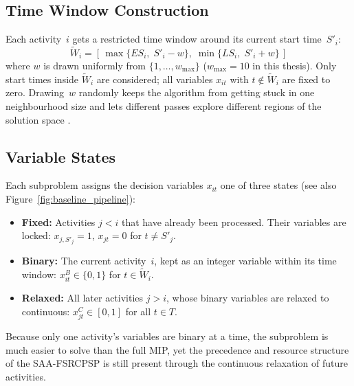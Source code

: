 \subsection{Time Window Construction}
\label{subsec:time_window}
Each activity~$i$ gets a restricted time window around its current
start time~$S'_i$:
\begin{equation}
    \widetilde{W}_i =
    \left[\,\max\{ES_i,\; S'_i - w\},\;
           \min\{LS_i,\; S'_i + w\}\,\right]
    \label{eq:time_window}
\end{equation}
where $w$ is drawn uniformly from $\{1, \ldots, w_{\max}\}$
($w_{\max} = 10$ in this thesis). Only start times inside
$\widetilde{W}_i$ are considered; all variables $x_{it}$ with
$t \notin \widetilde{W}_i$ are fixed to zero. Drawing~$w$ randomly
keeps the algorithm from getting stuck in one neighbourhood size
and lets different passes explore different regions of the solution
space \parencite{pochet2006}.
\subsection{Variable States}
\label{subsec:variable_states}
Each subproblem assigns the decision variables $x_{it}$ one of
three states (see also Figure~\ref{fig:baseline_pipeline}):
\begin{itemize}
    \item \textbf{Fixed:} Activities $j < i$ that have already
          been processed. Their variables are locked:
          $x_{j, S'_j} = 1$, $x_{jt} = 0$ for $t \neq S'_j$.
    \item \textbf{Binary:} The current activity~$i$, kept as an
          integer variable within its time window:
          $x^B_{it} \in \{0,1\}$ for $t \in \widetilde{W}_i$.
    \item \textbf{Relaxed:} All later activities $j > i$, whose
          binary variables are relaxed to continuous:
          $x^C_{jt} \in [0,1]$ for all $t \in T$.
\end{itemize}
Because only one activity's variables are binary at a time, the
subproblem is much easier to solve than the full MIP, yet the
precedence and resource structure of the SAA-FSRCPSP is still
present through the continuous relaxation of future activities.

